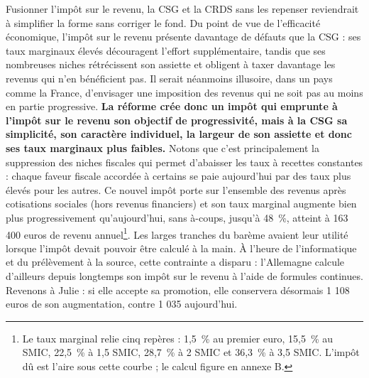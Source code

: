 \documentclass[10pt,a4paper]{article}
\begin{document}
Fusionner l’impôt sur le revenu, la CSG et la CRDS sans les repenser reviendrait à simplifier la forme sans corriger le fond. Du point de vue de l’efficacité économique, l’impôt sur le revenu présente davantage de défauts que la CSG : ses taux marginaux élevés découragent l’effort supplémentaire, tandis que ses nombreuses niches rétrécissent son assiette et obligent à taxer davantage les revenus qui n’en bénéficient pas. Il serait néanmoins illusoire, dans un pays comme la France, d’envisager une imposition des revenus qui ne soit pas au moins en partie progressive. \textbf{La réforme crée donc un impôt qui emprunte à l’impôt sur le revenu son objectif de progressivité, mais à la CSG sa simplicité, son caractère individuel, la largeur de son assiette et donc ses taux marginaux plus faibles.} Notons que c'est principalement la suppression des niches fiscales qui permet d’abaisser les taux à recettes constantes : chaque faveur fiscale accordée à certains se paie aujourd’hui par des taux plus élevés pour les autres. Ce nouvel impôt porte sur l’ensemble des revenus après cotisations sociales (hors revenus financiers) et son taux marginal augmente bien plus progressivement qu'aujourd'hui, sans à-coups, jusqu’à 48~\%, atteint à 163 400 euros de revenu annuel\footnote{Le taux marginal relie cinq repères : 1,5~\% au premier euro, 15,5~\% au SMIC, 22,5~\% à 1,5 SMIC, 28,7~\% à 2 SMIC et 36,3~\% à 3,5 SMIC. L'impôt dû est l'aire sous cette courbe ; le calcul figure en annexe B.}. Les larges tranches du barème avaient leur utilité lorsque l’impôt devait pouvoir être calculé à la main. À l’heure de l’informatique et du prélèvement à la source, cette contrainte a disparu : l’Allemagne calcule d’ailleurs depuis longtemps son impôt sur le revenu à l’aide de formules continues. Revenons à Julie : si elle accepte sa promotion, elle conservera désormais 1 108 euros de son augmentation, contre 1 035 aujourd’hui.

\end{document}
